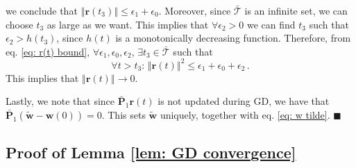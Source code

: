 \documentclass[twoside,11pt,english]{article}
\begin{document}
we conclude that $\left\Vert \mathbf{r}\left(t_{3}\right)\right\Vert \leq\epsilon_{1}+\epsilon_{0}$.
Moreover, since $\mathcal{\bar{\mathcal{T}}}$ is an infinite set,
we can choose $t_{3}$ as large as we want. This implies that $\forall\epsilon_{2}>0$
we can find $t_{3}$ such that $\epsilon_{2}>h\left(t_{3}\right)$,
since $h\left(t\right)$ is a monotonically decreasing function. Therefore, from eq. \ref{eq: r(t) bound}, 
$\forall\epsilon_{1},\epsilon_{0},\epsilon_{2}$, $\exists t_{3}\in \bar{\mathcal{T}}$
such that 
\[
\forall t>t_{3}:\,\left\Vert \mathbf{r}\left(t\right)\right\Vert ^{2}\leq\epsilon_{1}+\epsilon_{0}+\epsilon_{2}\,.
\]
This implies that $\left\Vert \mathbf{r}\left(t\right)\right\Vert \rightarrow0$.



Lastly, we note that since $\bar{\mathbf{P}}_{1}\mathbf{r}\left(t\right)$
is not updated during GD, we have that $\bar{\mathbf{P}}_{1}\left(\tilde{\mathbf{w}}-\mathbf{w}\left(0\right)\right)=0$.
This sets $\tilde{\mathbf{w}}$ uniquely, together with eq. \ref{eq: w tilde}.
$\blacksquare$

\subsection{Proof of Lemma \ref{lem: GD convergence}\label{sec:Proof of GD convergence}}

\GDconvergence*
\end{document}
